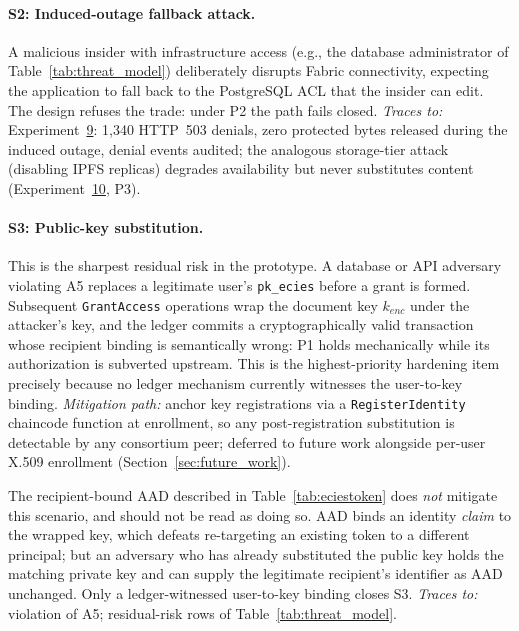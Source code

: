 \documentclass[preprint,12pt]{elsarticle}
\begin{document}
\paragraph{S2: Induced-outage fallback attack.} A malicious insider
with infrastructure access (e.g., the database administrator of
Table~\ref{tab:threat_model}) deliberately disrupts Fabric
connectivity, expecting the application to fall back to the
PostgreSQL ACL that the insider can edit. The design refuses the
trade: under P2 the path fails closed.
\emph{Traces to:} Experiment~\hyperref[sec:exp_failclosed]{9}:
1{,}340 HTTP~503 denials, zero protected bytes released during the
induced outage, denial events audited; the analogous storage-tier
attack (disabling IPFS replicas) degrades availability but never
substitutes content (Experiment~\hyperref[sec:exp_ipfscost]{10}, P3).

\paragraph{S3: Public-key substitution.} This is the sharpest
residual risk in the prototype. A database or API adversary violating A5 replaces a
legitimate user's \texttt{pk\_ecies} before a grant is formed.
Subsequent \texttt{GrantAccess} operations wrap the document key
$k_{enc}$ under the attacker's key, and the ledger commits a
cryptographically valid transaction whose recipient binding is
semantically wrong: P1 holds mechanically while its authorization is
subverted upstream. This is the highest-priority hardening item
precisely because no ledger mechanism currently witnesses the
user-to-key binding. \emph{Mitigation path:} anchor key registrations
via a \texttt{RegisterIdentity} chaincode function at enrollment, so
any post-registration substitution is detectable by any consortium
peer; deferred to future work alongside per-user X.509 enrollment
(Section~\ref{sec:future_work}).

The recipient-bound AAD described in Table~\ref{tab:eciestoken} does
\emph{not} mitigate this scenario, and should not be read as doing so. AAD
binds an identity \emph{claim} to the wrapped key, which defeats re-targeting
an existing token to a different principal; but an adversary who has already
substituted the public key holds the matching private key and can supply the
legitimate recipient's identifier as AAD unchanged. Only a ledger-witnessed
user-to-key binding closes S3. \emph{Traces to:} violation of A5;
residual-risk rows of Table~\ref{tab:threat_model}.
\end{document}
